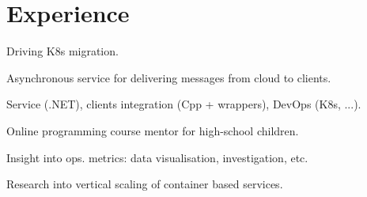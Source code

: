 \documentclass[a4paper]{deedy-resume} %
\begin{document}
\begin{minipage}[t]{0.62\textwidth} %


\section{Experience}


\vspace{\topsep} %

\begin{tightitemize}
\item Driving K8s migration.
\end{tightitemize}
\begin{tightitemize}
\item Asynchronous service for delivering messages from cloud to clients.
\item Service (.NET), clients integration (Cpp + wrappers), DevOps (K8s, ...).
\end{tightitemize}

\halfsectionspace %


\begin{tightitemize}
\item Online programming course mentor for high-school children.
\end{tightitemize}

\halfsectionspace %



\begin{tightitemize}
\item Insight into ops. metrics: data visualisation, investigation, etc.
\item Research into vertical scaling of container based services.
\end{tightitemize}


\end{minipage}
\end{document}
